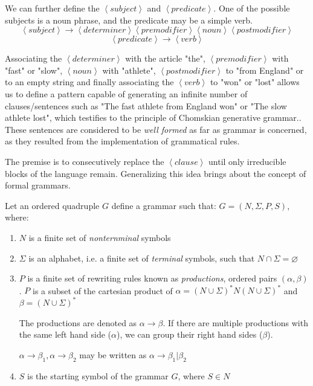 We can further define the $\left< subject \right>$ and $\left< predicate \right>$. One of the possible subjects is a noun phrase, and the predicate may be a simple verb.
$$\left< subject \right>   \rightarrow   \left< determiner \right>   \left< premodifier \right>    \left< noun \right>    \left< postmodifier \right>$$
$$\left< predicate \right> \rightarrow \left< verb \right>$$

Associating the $\left< determiner \right>$ with the article "the", $\left< premodifier \right>$ with "fast" or "slow", $\left< noun \right>$ with "athlete", $\left< postmodifier \right>$ to "from England" or to an empty string and finally associating the $\left< verb \right>$ to "won" or "lost" allows us to define a pattern capable of generating an infinite number of clauses/sentences such as "The fast athlete from England won" or "The slow athlete lost", which testifies to the principle of Chomskian generative grammar.. These sentences are considered to be \emph{well formed} as far as grammar is concerned, as they resulted from the implementation of grammatical rules.

The premise is to consecutively replace the $\left< clause \right>$ until only irreducible blocks of the language remain. Generalizing this idea brings about the concept of formal grammars.

\begin{definition}[Grammar]
\label{def:grammar}
\cite{Salomaa1987Formal}
Let an ordered quadruple $G$ define a grammar such that: $G=\left(N, \Sigma, P, S \right)$, where:
\begin{enumerate}
\item $N$ is a finite set of \emph{nonternminal} symbols
\item $\Sigma$ is an alphabet, i.e. a finite set of \emph{terminal} symbols, such that $N \cap \Sigma = \varnothing$
\item $P$ is a finite set of rewriting rules known as \emph{productions}, ordered pairs $\left( \alpha, \beta \right)$.
$P$ is a subset of the cartesian product of $\alpha = \left(N \cup \Sigma\right)^* N \left(N \cup \Sigma\right)^*$ and $\beta = \left(N \cup \Sigma\right)^*$


The productions are denoted as $\alpha \rightarrow \beta$.
If there are multiple productions with the same left hand side ($\alpha$), we can group their right hand sides ($\beta$).


$\alpha \rightarrow \beta_1, \alpha \rightarrow \beta_2$ may be written as $\alpha \rightarrow \beta_1 | \beta_2$

\item $S$ is the starting symbol of the grammar $G$, where $S \in N$
\end{enumerate}
\end{definition}

